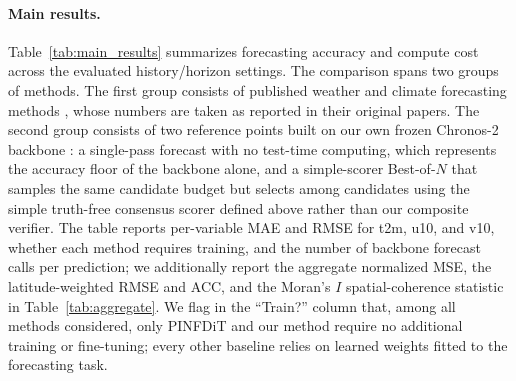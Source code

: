 \documentclass[preprint,12pt]{elsarticle}
\begin{document}
\paragraph{Main results.} Table~\ref{tab:main_results} summarizes forecasting accuracy and compute cost across the evaluated history/horizon settings. The comparison spans two groups of methods. The first group consists of published weather and climate forecasting methods \citep{park2025pint,verma2024climode,nguyen2023climax,cao2026pinfdit}, whose numbers are taken as reported in their original papers. The second group consists of two reference points built on our own frozen Chronos-2 backbone \citep{ansari2025chronos2}: a single-pass forecast with no test-time computing, which represents the accuracy floor of the backbone alone, and a simple-scorer Best-of-$N$ \citep{snell2024scaling} that samples the same candidate budget but selects among candidates using the simple truth-free consensus scorer defined above rather than our composite verifier. The table reports per-variable MAE and RMSE for t2m, u10, and v10, whether each method requires training, and the number of backbone forecast calls per prediction; we additionally report the aggregate normalized MSE, the latitude-weighted RMSE and ACC, and the Moran's $I$ spatial-coherence statistic in Table~\ref{tab:aggregate}. We flag in the ``Train?'' column that, among all methods considered, only PINFDiT \citep{cao2026pinfdit} and our method require no additional training or fine-tuning; every other baseline relies on learned weights fitted to the forecasting task.

\end{document}
